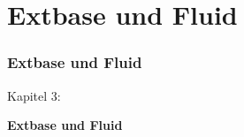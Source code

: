 %

\section{Extbase und Fluid}
\begin{frame}[fragile]
	\frametitle{Extbase und Fluid}

	\begin{center}\huge{Kapitel 3:}\end{center}
	\begin{center}\huge{\color{typo3darkgrey}\textbf{Extbase und Fluid}}\end{center}

\end{frame}

